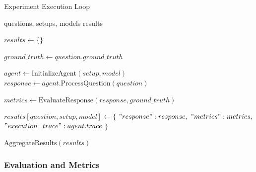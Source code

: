             
                \begin{algorithm}
                    \caption{Experiment Execution Loop}
                    \begin{algorithmic}[1]
                    \Require questions, setups, models
                    \Ensure results
                    
                        \State $results \gets \{\}$
                        
                            \State $ground\_truth \gets question.ground\_truth$
                            
                                    \State $agent \gets \text{InitializeAgent}(setup, model)$
                                    \State $response \gets agent.\text{ProcessQuestion}(question)$
                                    
                                    \State $metrics \gets \text{EvaluateResponse}(response, ground\_truth)$
                                    
                                    \State $results[question, setup, model] \gets \{$
                                    \State \hspace{1cm} $"response": response,$
                                    \State \hspace{1cm} $"metrics": metrics,$
                                    \State \hspace{1cm} $"execution\_trace": agent.trace$
                                    \State $\}$
                                \EndFor
                            \EndFor
                        \EndFor
                        
                        \State \Return $\text{AggregateResults}(results)$
                    \EndFunction
                    
                    \end{algorithmic}
                    \label{alg:execution_loop}
                \end{algorithm}
            
            \subsubsection{Evaluation and Metrics}

